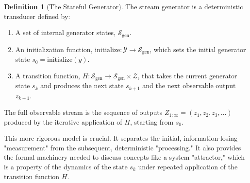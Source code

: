 \documentclass[12pt]{article}
\theoremstyle{definition}
\newtheorem{definition}{Definition}[section]
\begin{document}
\begin{center}
\end{center}

\begin{definition}[The Stateful Generator]
The stream generator is a deterministic transducer defined by:
\begin{enumerate}
    \item A set of internal generator states, $\mathcal{S}_{\text{gen}}$.
    \item An initialization function, $\text{initialize}: \mathcal{Y} \to \mathcal{S}_{\text{gen}}$, which sets the initial generator state $s_0 = \text{initialize}(y)$.
    \item A transition function, $H: \mathcal{S}_{\text{gen}} \to \mathcal{S}_{\text{gen}} \times \mathcal{Z}$, that takes the current generator state $s_k$ and produces the next state $s_{k+1}$ and the next observable output $z_{k+1}$.
\end{enumerate}
The full observable stream is the sequence of outputs $Z_{1:\infty} = (z_1, z_2, z_3, \dots)$ produced by the iterative application of $H$, starting from $s_0$.
\end{definition}

This more rigorous model is crucial. It separates the initial, information-losing "measurement" from the subsequent, deterministic "processing." It also provides the formal machinery needed to discuss concepts like a system "attractor," which is a property of the dynamics of the state $s_k$ under repeated application of the transition function $H$.
\end{document}
